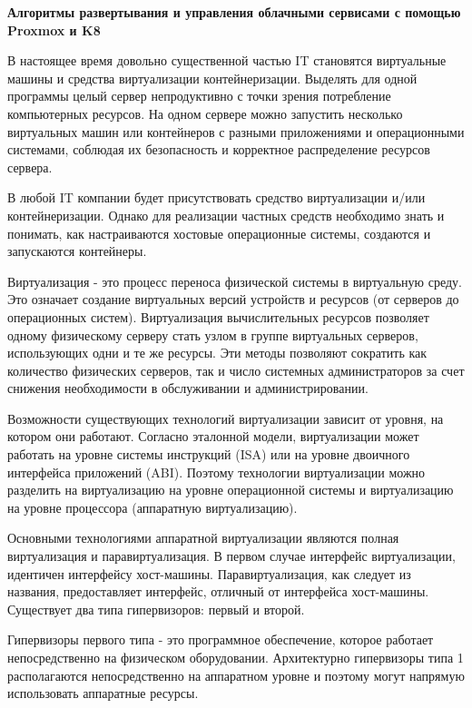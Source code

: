  \hypertarget{app-a}{\label{app-a}}

\textbf{Алгоритмы развертывания и управления облачными сервисами с помощью Proxmox и K8}

 
В настоящее время довольно существенной частью IT становятся виртуальные машины и средства виртуализации контейнеризации. Выделять для одной программы целый сервер непродуктивно с точки зрения потребление компьютерных ресурсов. На одном сервере можно запустить несколько виртуальных машин или контейнеров с разными приложениями и операционными системами, соблюдая их безопасность и корректное распределение ресурсов сервера.  

В любой IT компании будет присутствовать средство виртуализации и/или контейнеризации. Однако для реализации частных средств необходимо знать и понимать, как настраиваются хостовые операционные системы, создаются и запускаются контейнеры.


Виртуализация - это процесс переноса физической системы в виртуальную среду. Это означает создание виртуальных версий устройств и ресурсов (от серверов до операционных систем). Виртуализация вычислительных  ресурсов позволяет одному физическому серверу стать узлом в группе виртуальных серверов, использующих одни и те же ресурсы. Эти методы позволяют сократить как количество физических серверов, так и число системных администраторов за счет снижения необходимости в обслуживании и администрировании.

Возможности существующих технологий виртуализации зависит от уровня, на котором они работают. Согласно эталонной модели, виртуализации может работать на уровне системы инструкций (ISA) или на уровне двоичного интерфейса приложений (ABI). Поэтому технологии виртуализации можно разделить на виртуализацию на уровне операционной системы и виртуализацию на уровне процессора (аппаратную виртуализацию).


Основными технологиями аппаратной виртуализации являются полная виртуализация и паравиртуализация. В первом случае интерфейс виртуализации, идентичен интерфейсу хост-машины. Паравиртуализация, как следует из названия, предоставляет интерфейс, отличный от интерфейса хост-машины. Существует два типа гипервизоров: первый и второй.

Гипервизоры первого типа - это программное обеспечение, которое работает непосредственно на физическом оборудовании. Архитектурно гипервизоры типа 1 располагаются непосредственно на аппаратном уровне и поэтому могут напрямую использовать аппаратные ресурсы.

